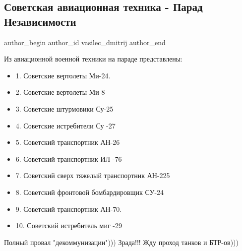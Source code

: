  
 
 
 
 
 
\subsection{Советская авиационная техника - Парад Независимости}
\label{sec:24_08_2021.fb.vasilec_dmitrij.1.sssr_aviacia_nezalezhnist_parad}
 
\ifcmt
 author_begin
   author_id vasilec_dmitrij
 author_end
\fi

Из авиационной военной техники на параде представлены:

\begin{itemize}
  \item 1. Советские вертолеты Ми-24.
  \item 2. Советские вертолеты Ми-8
  \item 3. Советские штурмовики Су-25
  \item 4. Советские истребители Су -27
  \item 5. Советский транспортник АН-26
  \item 6. Советский транспортник ИЛ -76
  \item 7. Советский сверх тяжелый транспортник АН-225
  \item 8. Советский фронтовой бомбардировщик СУ-24
  \item 9. Советский транспортник АН-70.
  \item 10. Советский истребитель миг -29
\end{itemize}

Полный провал "декоммунизации")))
Зрада!!!
Жду проход танков и БТР-ов)))

